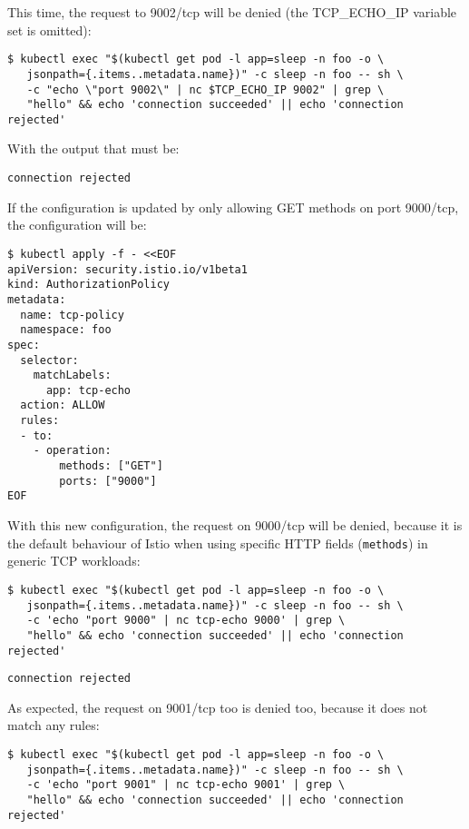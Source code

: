 \noindent This time, the request to 9002/tcp will be denied (the TCP\_ECHO\_IP variable set is omitted):

\begin{lstlisting}
$ kubectl exec "$(kubectl get pod -l app=sleep -n foo -o \
   jsonpath={.items..metadata.name})" -c sleep -n foo -- sh \ 
   -c "echo \"port 9002\" | nc $TCP_ECHO_IP 9002" | grep \
   "hello" && echo 'connection succeeded' || echo 'connection rejected'
\end{lstlisting}

\noindent With the output that must be:

\begin{lstlisting}
connection rejected
\end{lstlisting}

If the configuration is updated by only allowing GET methods on port 9000/tcp, the configuration will be:

\begin{lstlisting}
$ kubectl apply -f - <<EOF
apiVersion: security.istio.io/v1beta1
kind: AuthorizationPolicy
metadata:
  name: tcp-policy
  namespace: foo
spec:
  selector:
    matchLabels:
      app: tcp-echo
  action: ALLOW
  rules:
  - to:
    - operation:
        methods: ["GET"]
        ports: ["9000"]
EOF
\end{lstlisting}

\noindent With this new configuration, the request on 9000/tcp will be denied, because it is the default behaviour of Istio when using specific HTTP fields (\texttt{methods}) in generic TCP workloads:

\begin{lstlisting}
$ kubectl exec "$(kubectl get pod -l app=sleep -n foo -o \
   jsonpath={.items..metadata.name})" -c sleep -n foo -- sh \ 
   -c 'echo "port 9000" | nc tcp-echo 9000' | grep \
   "hello" && echo 'connection succeeded' || echo 'connection rejected'
\end{lstlisting}

\begin{lstlisting}
connection rejected
\end{lstlisting}

\noindent As expected, the request on 9001/tcp too is denied too, because it does not match any rules:

\begin{lstlisting}
$ kubectl exec "$(kubectl get pod -l app=sleep -n foo -o \
   jsonpath={.items..metadata.name})" -c sleep -n foo -- sh \ 
   -c 'echo "port 9001" | nc tcp-echo 9001' | grep \
   "hello" && echo 'connection succeeded' || echo 'connection rejected'
\end{lstlisting}

